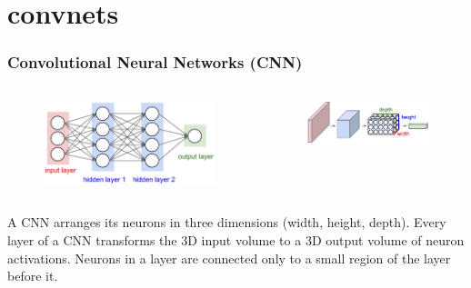 \section{convnets}

\begin{frame}
	\frametitle{Convolutional Neural Networks (CNN)}

	\begin{columns}
      		\begin{figure}
             		\includegraphics[width=1\textwidth]{Pics/neural_net2}
                \end{figure}
                \begin{figure}
                        \includegraphics[width=1\textwidth]{Pics/cnn}
                \end{figure}

        \end{columns}

	\vskip 0.5cm

	A CNN arranges its neurons in three dimensions (width, height, depth). 
	Every layer of a CNN transforms the 3D input volume to a 3D output volume of neuron activations.
	Neurons in a layer are connected only to a small region of the layer before it.

\end{frame}


